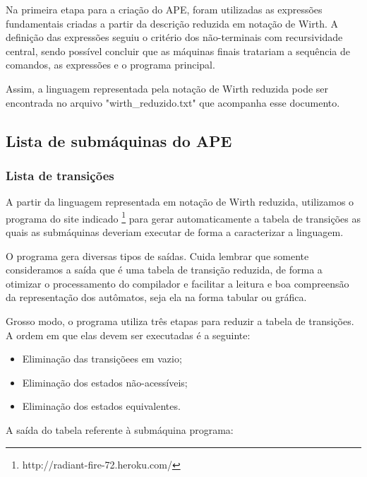     Na primeira etapa para a criação do APE, foram utilizadas as expressões fundamentais criadas a partir da descrição reduzida em notação de Wirth. A definição das expressões seguiu o critério dos não-terminais com recursividade central, sendo possível concluir que as máquinas finais tratariam a sequência de comandos, as expressões e o programa principal.


    Assim, a linguagem representada pela notação de Wirth reduzida pode ser encontrada no arquivo "wirth\_reduzido.txt" que acompanha esse documento.
    


  \subsection{Lista de submáquinas do APE}
    \subsubsection{Lista de transições}

      A partir da linguagem representada em notação de Wirth reduzida, utilizamos o programa do site indicado \footnote{http://radiant-fire-72.heroku.com/} para gerar automaticamente a tabela de transições as quais as submáquinas deveriam executar de forma a caracterizar a linguagem.


      O programa gera diversas tipos de saídas. Cuida lembrar que somente consideramos a saída que é uma tabela de transição reduzida, de forma a otimizar o processamento do compilador e facilitar a leitura e boa compreensão da representação dos autômatos, seja ela na forma tabular ou gráfica.


      Grosso modo, o programa utiliza três etapas para reduzir a tabela de transições. A ordem em que elas devem ser executadas é a seguinte:


      \begin{itemize}
        \item Eliminação das transiçõees em vazio;
        \item Eliminação dos estados não-acessíveis;
        \item Eliminação dos estados equivalentes.
      \end{itemize}


      A saída do tabela referente à submáquina programa:

      


